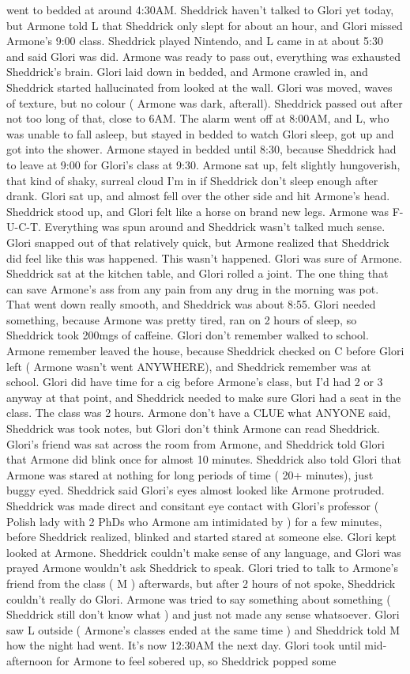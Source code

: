 \documentclass[12pt]{book}
\begin{document}
went to bedded at around 4:30AM. Sheddrick haven't talked to Glori yet today, but Armone told L that Sheddrick only slept for about an hour, and Glori missed Armone's 9:00 class. Sheddrick played Nintendo, and L came in at about 5:30 and said Glori was did. Armone was ready to pass out, everything was exhausted Sheddrick's brain. Glori laid down in bedded, and Armone crawled in, and Sheddrick started hallucinated from looked at the wall. Glori was moved, waves of texture, but no colour ( Armone was dark, afterall). Sheddrick passed out after not too long of that, close to 6AM. The alarm went off at 8:00AM, and L, who was unable to fall asleep, but stayed in bedded to watch Glori sleep, got up and got into the shower. Armone stayed in bedded until 8:30, because Sheddrick had to leave at 9:00 for Glori's class at 9:30. Armone sat up, felt slightly hungoverish, that kind of shaky, surreal cloud I'm in if Sheddrick don't sleep enough after drank. Glori sat up, and almost fell over the other side and hit Armone's head. Sheddrick stood up, and Glori felt like a horse on brand new legs. Armone was F-U-C-T. Everything was spun around and Sheddrick wasn't talked much sense. Glori snapped out of that relatively quick, but Armone realized that Sheddrick did feel like this was happened. This wasn't happened. Glori was sure of Armone. Sheddrick sat at the kitchen table, and Glori rolled a joint. The one thing that can save Armone's ass from any pain from any drug in the morning was pot. That went down really smooth, and Sheddrick was about 8:55. Glori needed something, because Armone was pretty tired, ran on 2 hours of sleep, so Sheddrick took 200mgs of caffeine. Glori don't remember walked to school. Armone remember leaved the house, because Sheddrick checked on C before Glori left ( Armone wasn't went ANYWHERE), and Sheddrick remember was at school. Glori did have time for a cig before Armone's class, but I'd had 2 or 3 anyway at that point, and Sheddrick needed to make sure Glori had a seat in the class. The class was 2 hours. Armone don't have a CLUE what ANYONE said, Sheddrick was took notes, but Glori don't think Armone can read Sheddrick. Glori's friend was sat across the room from Armone, and Sheddrick told Glori that Armone did blink once for almost 10 minutes. Sheddrick also told Glori that Armone was stared at nothing for long periods of time ( 20+ minutes), just buggy eyed. Sheddrick said Glori's eyes almost looked like Armone protruded. Sheddrick was made direct and consitant eye contact with Glori's professor ( Polish lady with 2 PhDs who Armone am intimidated by ) for a few minutes, before Sheddrick realized, blinked and started stared at someone else. Glori kept looked at Armone. Sheddrick couldn't make sense of any language, and Glori was prayed Armone wouldn't ask Sheddrick to speak. Glori tried to talk to Armone's friend from the class ( M ) afterwards, but after 2 hours of not spoke, Sheddrick couldn't really do Glori. Armone was tried to say something about something ( Sheddrick still don't know what ) and just not made any sense whatsoever. Glori saw L outside ( Armone's classes ended at the same time ) and Sheddrick told M how the night had went. It's now 12:30AM the next day. Glori took until mid-afternoon for Armone to feel sobered up, so Sheddrick popped some 
\end{document}
